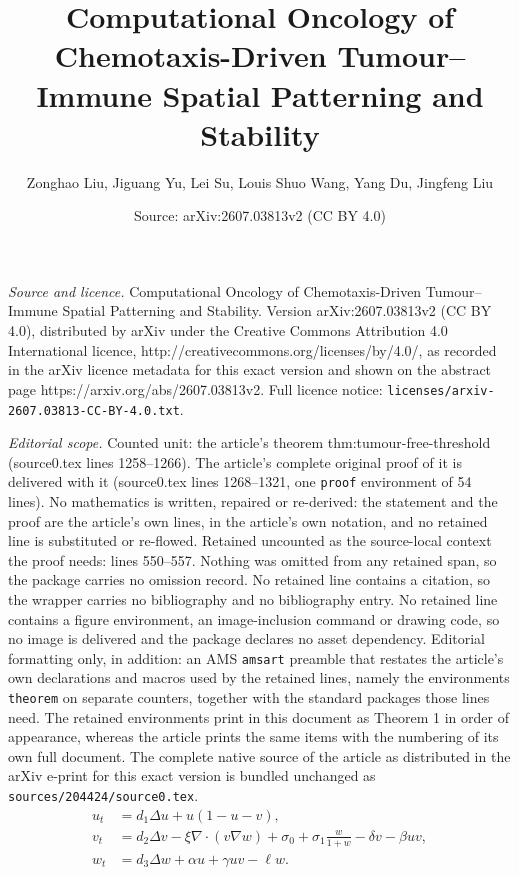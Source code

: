 \documentclass[10pt,a4paper]{amsart}
\title{Computational Oncology of Chemotaxis-Driven Tumour--Immune Spatial Patterning and Stability}
\author{Zonghao Liu, Jiguang Yu, Lei Su, Louis Shuo Wang, Yang Du, Jingfeng Liu}
\date{Source: arXiv:2607.03813v2 (CC BY 4.0)}
\begin{document}
\maketitle

\noindent\emph{Source and licence.} Computational Oncology of Chemotaxis-Driven Tumour--Immune Spatial Patterning and Stability. Version arXiv:2607.03813v2 (CC BY 4.0), distributed by arXiv under the Creative Commons Attribution 4.0 International licence, http://creativecommons.org/licenses/by/4.0/, as recorded in the arXiv licence metadata for this exact version and shown on the abstract page https://arxiv.org/abs/2607.03813v2. Full licence notice: \texttt{licenses/arxiv-2607.03813-CC-BY-4.0.txt}.\par\smallskip

\noindent\textit{Editorial scope.} Counted unit: the article's theorem thm:tumour-free-threshold (source0.tex lines 1258--1266). The article's complete original proof of it is delivered with it (source0.tex lines 1268--1321, one \texttt{proof} environment of 54 lines). No mathematics is written, repaired or re-derived: the statement and the proof are the article's own lines, in the article's own notation, and no retained line is substituted or re-flowed.  Retained uncounted as the source-local context the proof needs: lines 550--557.  Nothing was omitted from any retained span, so the package carries no omission record.  No retained line contains a citation, so the wrapper carries no bibliography and no bibliography entry.  No retained line contains a figure environment, an image-inclusion command or drawing code, so no image is delivered and the package declares no asset dependency.  Editorial formatting only, in addition: an AMS \texttt{amsart} preamble that restates the article's own declarations and macros used by the retained lines, namely the environments \texttt{theorem} on separate counters, together with the standard packages those lines need.  The retained environments print in this document as Theorem 1 in order of appearance, whereas the article prints the same items with the numbering of its own full document.  The complete native source of the article as distributed in the arXiv e-print for this exact version is bundled unchanged as \texttt{sources/204424/source0.tex}.
\begin{equation}\label{eq:nondim-model}
\begin{aligned}
u_t &= d_1\Delta u+u(1-u-v),\\
v_t &= d_2\Delta v-\xi\nabla\cdot(v\nabla w)
      +\sigma_0+\sigma_1\frac{w}{1+w}-\delta v-\beta uv,\\
w_t &= d_3\Delta w+\alpha u+\gamma uv-\ell w.
\end{aligned}
\end{equation}
\end{document}
